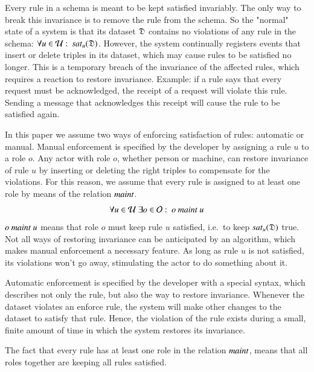\documentclass{elsarticle}
\begin{document}
   Every rule in a schema is meant to be kept satisfied invariably.
   The only way to break this invariance is to remove the rule from the schema.
   So the "normal" state of a system is that its dataset $\mathfrak{D}$ contains no violations of any rule in the schema:
   $\forall u\in\rules:\ \sat{u}{\dataset}$.
   However, the system continually registers events that insert or delete triples in its dataset,
   which may cause rules to be satisfied no longer.
   This is a temporary breach of the invariance of the affected rules,
   which requires a reaction to restore invariance.
   Example: if a rule says that every request must be acknowledged, the receipt of a request will violate this rule.
   Sending a message that acknowledges this receipt will cause the rule to be satisfied again.

   In this paper we assume two ways of enforcing satisfaction of rules: automatic or manual.
   Manual enforcement is specified by the developer by assigning a rule $u$ to a role $o$.
   Any actor with role $o$, whether person or machine,
   can restore invariance of rule $u$ by inserting or deleting the right triples to compensate for the violations.
   For this reason, we assume that every rule is assigned to at least one role by means of the relation $\text{\it maint\/}$.
\begin{equation}
   \forall u\in\rules\ \exists o\in\roles:\ o\ \maintain\ u\label{eqn:maintain}
\end{equation}
   $o\ \maintain\ u$ means that role $o$ must keep rule $u$ satisfied, i.e.\ to keep $\text{\it sat\/}_{u}(\mathfrak{D})$ true.
   Not all ways of restoring invariance can be anticipated by an algorithm, which makes manual enforcement a necessary feature.
   As long as rule $u$ is not satisfied, its violations won't go away, stimulating the actor to do something about it.

   Automatic enforcement is specified by the developer with a special syntax,
   which describes not only the rule, but also the way to restore invariance.
   Whenever the dataset violates an enforce rule,
   the system will make other changes to the dataset to satisfy that rule.
   Hence, the violation of the rule exists during a small, finite amount of time in which the system restores its invariance.

   The fact that every rule has at least one role in the relation $\text{\it maint\/}$, means that all roles together are keeping all rules satisfied.
\end{document}
